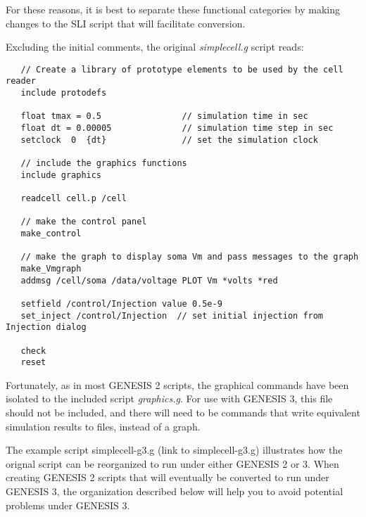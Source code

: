\documentclass[12pt]{article}
\begin{document}
For these reasons, it is best to separate these functional categories
by making changes to the SLI script that will facilitate conversion.

Excluding the initial comments, the original {\it simplecell.g} script reads:
\begin{verbatim}
   // Create a library of prototype elements to be used by the cell reader
   include protodefs

   float tmax = 0.5                // simulation time in sec
   float dt = 0.00005              // simulation time step in sec
   setclock  0  {dt}               // set the simulation clock

   // include the graphics functions
   include graphics

   readcell cell.p /cell

   // make the control panel
   make_control

   // make the graph to display soma Vm and pass messages to the graph
   make_Vmgraph
   addmsg /cell/soma /data/voltage PLOT Vm *volts *red

   setfield /control/Injection value 0.5e-9
   set_inject /control/Injection  // set initial injection from Injection dialog

   check
   reset
\end{verbatim}

Fortunately, as in most GENESIS 2 scripts, the graphical commands have
been isolated to the included script {\it graphics.g}.   For use with GENESIS 3,
this file should not be included, and there will need to be commands
that write equivalent simulation results to files, instead of a graph.

The example script simplecell-g3.g (link to simplecell-g3.g) illustrates
how the orignal script can be reorganized to run under either GENESIS
2 or 3.  When creating GENESIS 2 scripts that will eventually be converted
to run under GENESIS 3, the organization described below will help you
to avoid potential problems under GENESIS 3.
\end{document}
